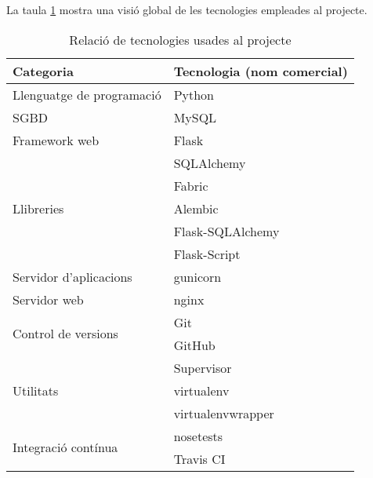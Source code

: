 	La taula \ref{table:tecnologies} mostra una visió global de les tecnologies empleades al projecte.

\begin{table}[h!]
 	\begin{center}
 		\begin{tabularx}{\textwidth}{|l|X|}
  			\hline
 			\bfseries Categoria & \bfseries Tecnologia (nom comercial) \\ \hline
			Llenguatge de programació &  Python \\ \hline
			\ac{SGBD} & MySQL \\ \hline
			Framework web & Flask\\ \hline
			\multirow{5}{*}{Llibreries} & SQLAlchemy  \\
 & Fabric \\
 & Alembic \\
 & Flask-SQLAlchemy \\
 & Flask-Script\\ \hline
 Servidor d'aplicacions & gunicorn \\ \hline
 Servidor web & nginx \\ \hline
\multirow{2}{*}{Control de versions} & Git \\ & GitHub \\ \hline
\multirow{3}{*}{Utilitats} & Supervisor \\ & virtualenv \\ & virtualenvwrapper\\ \hline
\multirow{2}{*}{Integració contínua} & nosetests \\ & Travis CI \\ \hline
		\end{tabularx}
	\end{center}
	\label{table:tecnologies}
	\caption{Relació de tecnologies usades al projecte} 
\end{table}